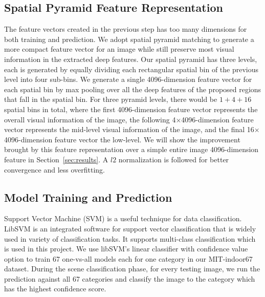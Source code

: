 \subsection{Spatial Pyramid Feature Representation}
The feature vectors created in the previous step has too many dimensions for
both training and prediction. We adopt spatial pyramid matching to generate
a more compact feature vector for an image while still preserve most visual
information in the extracted deep features.  Our spatial pyramid has three
levels, each is generated by equally dividing each rectangular spatial bin of
the previous level into four sub-bins. We generate a single 4096-dimension
feature vector for each spatial bin by max pooling over all the deep features
of the proposed regions that fall in the spatial bin. For three pyramid levels,
there would be $1+4+16$ spatial bins in total, where the first 4096-dimension
feature vector represents the overall visual information of the image, the
following 4$\times$4096-dimension feature vector represents the mid-level
visual information of the image, and the final 16$\times$4096-dimension feature
vector the low-level. We will show the improvement brought by this feature
representation over a simple entire image 4096-dimension feature in
Section~\ref{sec:results}. A $l2$ normalization is followed for better
convergence and less overfitting.

\subsection{Model Training and Prediction}
Support Vector Machine (SVM) is a useful technique for data classification.
LibSVM\cite{Chang:2011:CC01a} is an integrated software for support vector
classification that is widely used in variety of classification tasks.  It
supports multi-class classification which is used in this project.  We use
libSVM's linear classifier with confidence value option to train 67 one-vs-all
models each for one category in our MIT-indoor67 dataset. During the scene
classification phase, for every testing image, we run the prediction against
all 67 categories and classify the image to the category which has the highest
confidence score.

